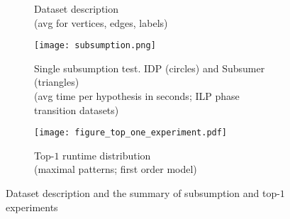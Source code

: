 \begin{figure}[t]
  \captionsetup{
    skip=-5pt
  }
  \begin{center}
    \begin{subfigure}{.39\textwidth}
      \begin{center}
      \end{center}
      \caption{Dataset description\\ (avg for vertices, edges, labels)}
      \label{table:datasets}
    \end{subfigure}
    \hfill
    \begin{subfigure}{.60\textwidth}
      \phantom{-}
      \texttt{[image: subsumption.png]}
      \caption{Single subsumption test. IDP (circles) and Subsumer (triangles) \\ (avg time per hypothesis in seconds; ILP phase transition datasets)}
      \label{figure:subsumption}
    \end{subfigure}
    \hfill 
    \begin{subfigure}{.70\textwidth}
      \texttt{[image: figure\_top\_one\_experiment.pdf]}
      \caption{Top-$1$ runtime distribution \\(maximal patterns; first order model)}
      \label{fig:fol_top_experiments}
    \end{subfigure}
  \end{center}
  \caption{Dataset description and the summary of subsumption and top-$1$ experiments}
\end{figure}
